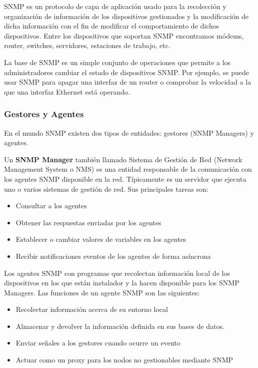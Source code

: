 \ac{SNMP} es un protocolo de capa de aplicación usado para la recolección y organización de
información de los dispositivos gestionados y la modificación de dicha información con el fin de 
modificar el comportamiento de dichos dispositivos. Entre los dispositivos que soportan SNMP 
encontramos módems, router, switches, servidores, estaciones de trabajo, etc.

La base de \ac{SNMP} es un simple conjunto de operaciones que permite a los administradores cambiar el
estado de dispositivos SNMP. Por ejemplo, se puede usar \ac{SNMP} para apagar una interfaz de un router o
comprobar la velocidad a la que una interfaz Ethernet está operando. 

\subsubsection{Gestores y Agentes}

En el mundo \ac{SNMP} existen dos tipos de entidades: gestores (\ac{SNMP} Managers) y agentes. 

Un \textbf{SNMP Manager} también llamado Sistema de Gestión de Red (Network Management System o NMS)
es una entidad responsable de la comunicación con los agentes \ac{SNMP} disponible en la red. Típicamente
es un servidor que ejecuta uno o varios sistemas de gestión de red. Sus principales tareas son:

\begin{itemize}
    \item Consultar a los agentes
    \item Obtener las respuestas enviadas por los agentes
    \item Establecer o cambiar valores de variables en los agentes
    \item Recibir notificaciones eventos de los agentes de forma asíncrona
\end{itemize}

Los agentes SNMP con programas que recolectan información local de los dispositivos en los que están
instalador y la hacen disponible para los SNMP Managers. Las funciones de un agente SNMP son las
siguientes:

\begin{itemize}
    \item Recolectar información acerca de su entorno local
    \item Almacenar y devolver la información definida en sus bases de datos.
    \item Enviar señales a los gestores cuando ocurre un evento
    \item Actuar como un proxy para los nodos no gestionables mediante SNMP
\end{itemize}

